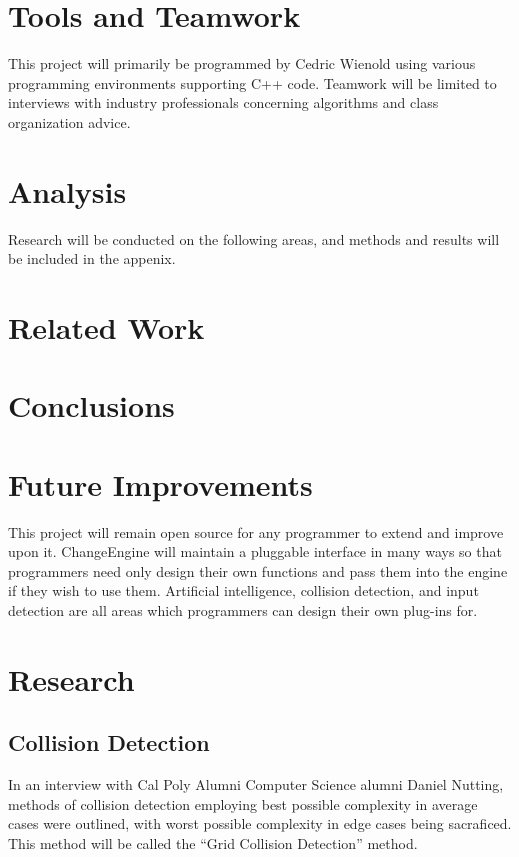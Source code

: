 \documentclass[12pt]{article}
\begin{document}
  \section{Tools and Teamwork}
    This project will primarily be programmed by Cedric Wienold using various programming environments supporting C++ code. Teamwork will be limited to interviews with industry professionals concerning algorithms and class organization advice.

  \section{Analysis}
    Research will be conducted on the following areas, and methods and results will be included in the appenix.

  \section{Related Work}

  \section{Conclusions}

  \section{Future Improvements}
    This project will remain open source for any programmer to extend and improve upon it. ChangeEngine will maintain a pluggable interface in many ways so that programmers need only design their own functions and pass them into the engine if they wish to use them. Artificial intelligence, collision detection, and input detection are all areas which programmers can design their own plug-ins for.

  \newpage

  \appendix
  \section{Research}

  \subsection{Collision Detection}
    In an interview with Cal Poly Alumni Computer Science alumni Daniel Nutting, methods of collision detection employing best possible complexity in average cases were outlined, with worst possible complexity in edge cases being sacraficed. This method will be called the ``Grid Collision Detection'' method.
\end{document}
